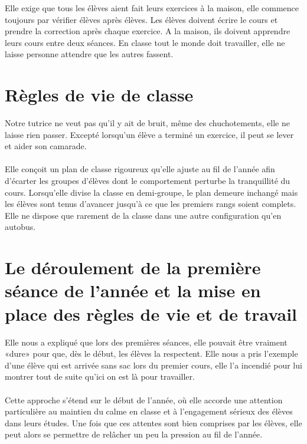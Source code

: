 Elle exige que tous les élèves aient fait leurs exercices à la maison,
elle commence toujours par vérifier élèves après élèves.
Les élèves doivent écrire le cours et prendre la correction après chaque exercice.
A la maison,
ils doivent apprendre leurs cours entre deux séances. En classe tout le monde doit travailler,
elle ne laisse personne attendre que les autres fassent.

\section{Règles de vie de classe}

Notre tutrice ne veut pas qu'il y ait de bruit,
même des chuchotements, elle ne laisse rien passer.
Excepté lorsqu'un élève a terminé un exercice,
il peut se lever et aider son camarade.
\\\\
Elle conçoit un plan de classe rigoureux qu'elle ajuste au fil de l'année afin d'écarter les groupes d'élèves dont le comportement perturbe la tranquillité du cours.
Lorsqu'elle divise la classe en demi-groupe,
le plan demeure inchangé mais les élèves sont tenus d'avancer jusqu'à ce que les premiers rangs soient complets.
Elle ne dispose que rarement de la classe dans une autre configuration qu'en autobus.

\section{Le déroulement de la première séance de l'année et la mise en place des règles de vie et de travail}

Elle nous a expliqué que lors des premières séances, elle pouvait être vraiment
«dure» pour que,
dès le début,
les élèves la respectent.
Elle nous a pris l'exemple d'une élève qui est arrivée sans sac lors du premier cours,
elle l'a incendié pour lui montrer tout de suite qu'ici on est là pour travailler.
\\\\
Cette approche s'étend sur le début de l'année,
où elle accorde une attention particulière au maintien du calme en classe et à l'engagement sérieux des élèves dans leurs études.
Une fois que ces attentes sont bien comprises par les élèves,
elle peut alors se permettre de relâcher un peu la pression au fil de l'année.